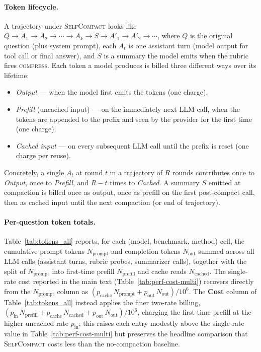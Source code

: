 \documentclass{article}
\newcommand{\method}{\textsc{{SelfCompact}}}
\begin{document}
\paragraph{Token lifecycle.} A trajectory under \method{} looks like
$Q \to A_1 \to A_2 \to \cdots \to A_k \to S \to A'_1 \to A'_2 \to \cdots$,
where $Q$ is the original question (plus system prompt), each $A_t$
is one assistant turn (model output for tool call or final answer),
and $S$ is a summary the model emits when the rubric fires
\textsc{compress}. Each token a model produces is billed three different
ways over its lifetime:
\begin{itemize}[leftmargin=*]\setlength\itemsep{0pt}
\item \emph{Output} — when the model first emits the tokens (one charge).
\item \emph{Prefill} (uncached input) — on the immediately next LLM call,
when the tokens are appended to the prefix and seen by the provider for
the first time (one charge).
\item \emph{Cached input} — on every subsequent LLM call until the
prefix is reset (one charge per reuse).
\end{itemize}
Concretely, a single $A_t$ at round $t$ in a trajectory of $R$ rounds
contributes once to \emph{Output}, once to \emph{Prefill}, and $R-t$
times to \emph{Cached}. A summary $S$ emitted at compaction is billed
once as output, once as prefill on the first post-compact call, then as
cached input until the next compaction (or end of trajectory).

\paragraph{Per-question token totals.} Table~\ref{tab:tokens_all}
reports, for each (model, benchmark, method) cell, the cumulative prompt
tokens $N_{\text{prompt}}$ and completion tokens $N_{\text{out}}$ summed
across all LLM calls (assistant turns, rubric probes, summarizer calls),
together with the split of $N_{\text{prompt}}$ into first-time prefill
$N_{\text{prefill}}$ and cache reads $N_{\text{cached}}$. The single-rate
cost reported in the main text (Table~\ref{tab:perf-cost-multi})
recovers directly from the $N_{\text{prompt}}$ column as
$(p_{\text{cache}}\,N_{\text{prompt}} + p_{\text{out}}\,N_{\text{out}})/10^{6}$.
The \textbf{Cost} column of Table~\ref{tab:tokens_all} instead applies
the finer two-rate billing,
$(p_{\text{in}}\,N_{\text{prefill}} + p_{\text{cache}}\,N_{\text{cached}}
+ p_{\text{out}}\,N_{\text{out}})/10^{6}$,
charging the first-time prefill at the higher uncached rate
$p_{\text{in}}$; this raises each entry modestly above the single-rate
value in Table~\ref{tab:perf-cost-multi} but preserves the headline
comparison that \method{} costs less than the no-compaction baseline.
\end{document}
